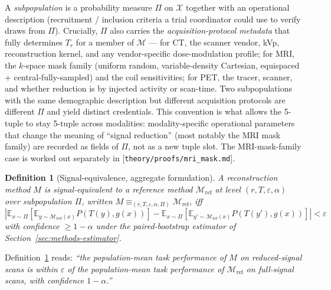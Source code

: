 \documentclass[twoside,11pt]{article}
\newtheorem{definition}{Definition}
\newcommand{\Mref}{\mathcal{M}_{\textrm{ref}}}
\newcommand{\Mred}{\mathcal{M}_{\textrm{red}}}
\newcommand{\E}{\mathbb{E}}
\begin{document}
A \emph{subpopulation} is a probability measure $\Pi$ on $\mathcal{X}$ together with an operational description (recruitment / inclusion criteria a trial coordinator could use to verify draws from $\Pi$). Crucially, $\Pi$ also carries the \emph{acquisition-protocol metadata} that fully determines $T_r$ for a member of $\mathcal{M}$ --- for CT, the scanner vendor, kVp, reconstruction kernel, and any vendor-specific dose-modulation profile; for MRI, the $k$-space mask family (uniform random, variable-density Cartesian, equispaced + central-fully-sampled) and the coil sensitivities; for PET, the tracer, scanner, and whether reduction is by injected activity or scan-time. Two subpopulations with the same demographic description but different acquisition protocols are different $\Pi$ and yield distinct credentials. This convention is what allows the 5-tuple to stay 5-tuple across modalities: modality-specific operational parameters that change the meaning of ``signal reduction'' (most notably the MRI mask family) are recorded as fields of $\Pi$, not as a new tuple slot. The MRI-mask-family case is worked out separately in [\texttt{theory/proofs/mri\_mask.md}].

\begin{definition}[Signal-equivalence, aggregate formulation]
\label{def:signal_equiv_aggregate}
A reconstruction method $M$ is \emph{signal-equivalent} to a reference method $\Mref$ at level $(r, T, \varepsilon, \alpha)$ over subpopulation $\Pi$, written $M \equiv_{(r, T, \varepsilon, \alpha, \Pi)} \Mref$, iff
\begin{equation}
    \left| \E_{x \sim \Pi}\left[ \E_{y \sim \Mred(x)} P(T(y), g(x)) \right] - \E_{x \sim \Pi}\left[ \E_{y' \sim \Mref(x)} P(T(y'), g(x)) \right] \right| < \varepsilon \label{eq:signal_equiv_main}
\end{equation}
with confidence $\geq 1 - \alpha$ under the paired-bootstrap estimator of Section~\ref{sec:methods-estimator}.
\end{definition}

Definition~\ref{def:signal_equiv_aggregate} reads: \textit{``the population-mean task performance of $M$ on reduced-signal scans is within $\varepsilon$ of the population-mean task performance of $\Mref$ on full-signal scans, with confidence $1-\alpha$.''}
\end{document}

